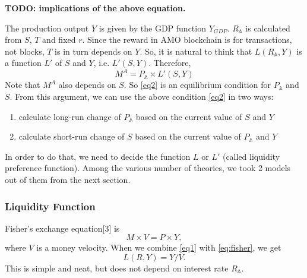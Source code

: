 \documentclass[a4paper,11pt]{scrartcl}
\newcommand{\amom}{\mathbb{A}}
\begin{document}
\textbf{TODO: implications of the above equation.}

The production output $Y$ is given by the GDP function $Y_{GDP}$. $R_\amom$ is
calculated from $S$, $T$ and fixed $r$. Since the reward in AMO blockchain is
for transactions, not blocks, $T$ is in turn depends on $Y$. So, it is natural
to think that $L(R_\amom,Y)$ is a function $L'$ of $S$ and $Y$, i.e. $L'(S,Y)$.
Therefore,
\begin{equation}
	M^A = P_\amom \times L'(S,Y) \label{eq2}
\end{equation}
Note that $M^A$ also depends on $S$. So \eqref{eq2} is an equilibrium
condition for $P_\amom$ and $S$. From this argument, we can use the above
condition \eqref{eq2} in two ways:
\begin{enumerate}
	\item calculate long-run change of $P_\amom$ based on the current value of
		$S$ and $Y$
	\item calculate short-run change of $S$ based on the current value of
		$P_\amom$ and $Y$
\end{enumerate}

In order to do that, we need to decide the function $L$ or $L'$ (called
liquidity preference function). Among the various number of theories, we took 2
models out of them from the next section.

\subsubsection{Liquidity Function} \label{liquidity}
Fisher's exchange equation[3] is
\begin{equation}
	M \times V = P \times Y, \label{eq:fisher}
\end{equation}
where $V$ is a money velocity. When we combine \eqref{eq1} with
\eqref{eq:fisher}, we get
\begin{equation}
	L(R, Y) = Y / V. \label{eq3}
\end{equation}
This is simple and neat, but does not depend on interest rate $R_\amom$.
\end{document}

